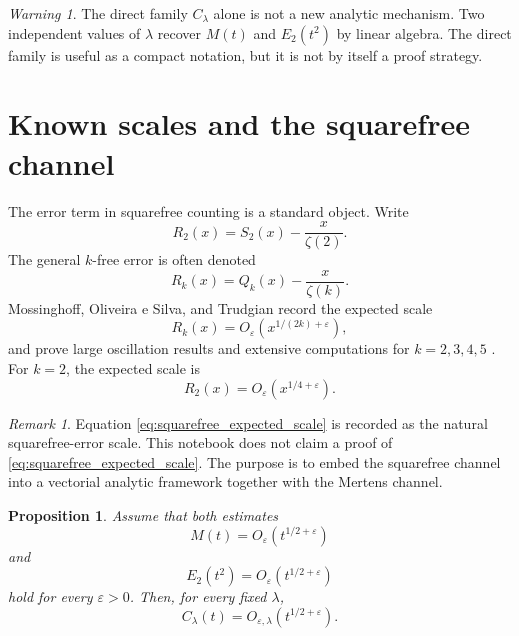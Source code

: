 \documentclass[11pt]{amsart}
\numberwithin{equation}{section}
\theoremstyle{plain}
\newtheorem{proposition}[theorem]{Proposition}
\theoremstyle{definition}
\theoremstyle{remark}
\newtheorem{remark}[theorem]{Remark}
\newtheorem{warning}[theorem]{Warning}
\begin{document}
\begin{warning}
\label{warn:direct_family_is_change_of_coordinates}
The direct family \(C_\lambda\) alone is not a new analytic mechanism.  Two independent values of \(\lambda\) recover \(M(t)\) and \(E_2(t^2)\) by linear algebra.  The direct family is useful as a compact notation, but it is not by itself a proof strategy.
\end{warning}

\section{Known scales and the squarefree channel}
\label{sec:known_scales_squarefree_channel}

The error term in squarefree counting is a standard object.  Write
\begin{equation}
R_2(x)=S_2(x)-\frac{x}{\zeta(2)}.
\label{eq:R2_literature_definition}
\end{equation}
The general \(k\)-free error is often denoted
\begin{equation}
R_k(x)=Q_k(x)-\frac{x}{\zeta(k)}.
\label{eq:Rk_literature_definition}
\end{equation}
Mossinghoff, Oliveira e Silva, and Trudgian record the expected scale
\begin{equation}
R_k(x)=O_\varepsilon\left(x^{1/(2k)+\varepsilon}\right),
\label{eq:kfree_expected_scale}
\end{equation}
and prove large oscillation results and extensive computations for \(k=2,3,4,5\) \cite{MossinghoffOliveiraTrudgian2021}.  For \(k=2\), the expected scale is
\begin{equation}
R_2(x)=O_\varepsilon\left(x^{1/4+\varepsilon}\right).
\label{eq:squarefree_expected_scale}
\end{equation}

\begin{remark}
\label{rem:squarefree_channel_status}
Equation \eqref{eq:squarefree_expected_scale} is recorded as the natural squarefree-error scale.  This notebook does not claim a proof of \eqref{eq:squarefree_expected_scale}.  The purpose is to embed the squarefree channel into a vectorial analytic framework together with the Mertens channel.
\end{remark}

\begin{proposition}
\label{prop:direct_cota_would_be_strong}
Assume that both estimates
\begin{equation}
M(t)=O_\varepsilon\left(t^{1/2+\varepsilon}\right)
\label{eq:mertens_rh_scale_estimate}
\end{equation}
and
\begin{equation}
E_2(t^2)=O_\varepsilon\left(t^{1/2+\varepsilon}\right)
\label{eq:squarefree_rescaled_rh_scale_estimate}
\end{equation}
hold for every \(\varepsilon>0\).  Then, for every fixed \(\lambda\),
\begin{equation}
C_\lambda(t)=O_{\varepsilon,\lambda}\left(t^{1/2+\varepsilon}\right).
\label{eq:C_lambda_direct_bound}
\end{equation}
\end{proposition}
\end{document}
